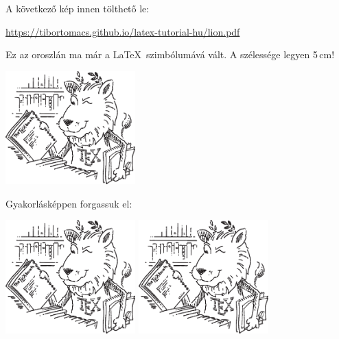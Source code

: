 \documentclass[a4paper,12pt]{article}
\begin{document}
A következő kép innen tölthető le:
\begin{center}
\url{https://tibortomacs.github.io/latex-tutorial-hu/lion.pdf}
\end{center}
Ez az oroszlán ma már a \LaTeX\ szimbólumává vált. A szélessége legyen
5\,cm!
\begin{center}
\includegraphics[width=5cm]{Képek/lion}
\end{center}
Gyakorlásképpen forgassuk el:
\begin{center}
\includegraphics[width=5cm,origin=c,angle=90]{Képek/lion}
\includegraphics[width=5cm,origin=c,angle=-90]{Képek/lion}
\end{center}
\end{document}
